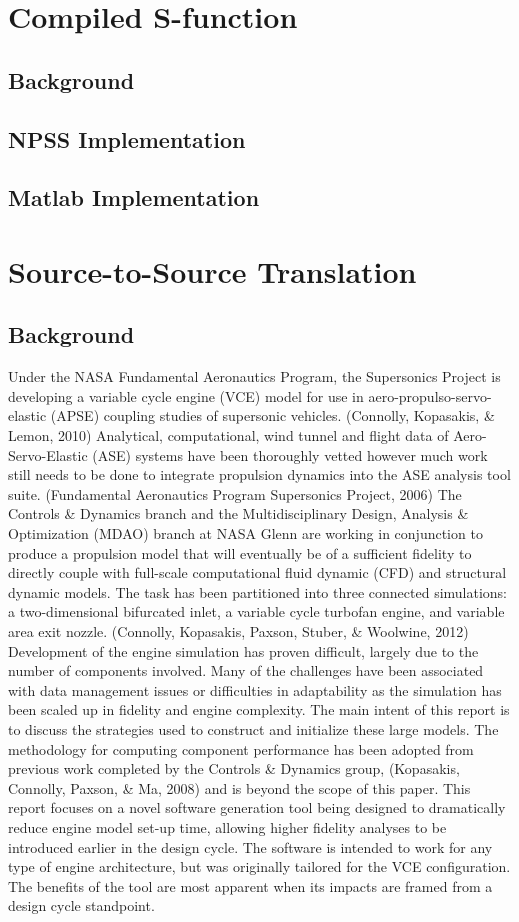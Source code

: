 \documentclass[heading.tex]{subfiles}
\begin{document}
\section{Compiled S-function}
\subsection{Background}
\subsection{NPSS Implementation}
\subsection{Matlab Implementation}

\section{Source-to-Source Translation}
\subsection{Background}
Under the NASA Fundamental Aeronautics Program, the Supersonics Project is developing a variable cycle engine (VCE) model for use in aero-propulso-servo-elastic (APSE) coupling studies of supersonic vehicles. (Connolly, Kopasakis, \& Lemon, 2010) Analytical, computational, wind tunnel and flight data of Aero-Servo-Elastic (ASE) systems have been thoroughly vetted however much work still needs to be done to integrate propulsion dynamics into the ASE analysis tool suite. (Fundamental Aeronautics Program Supersonics Project, 2006)
The Controls \& Dynamics branch and the Multidisciplinary Design, Analysis \& Optimization (MDAO) branch at NASA Glenn are working in conjunction to produce a propulsion model that will eventually be of a sufficient fidelity to directly couple with full-scale computational fluid dynamic (CFD) and structural dynamic models. The task has been partitioned into three connected simulations: a two-dimensional bifurcated inlet, a variable cycle turbofan engine, and variable area exit nozzle. (Connolly, Kopasakis, Paxson, Stuber, \& Woolwine, 2012) 
Development of the engine simulation has proven difficult, largely due to the number of components involved. Many of the challenges have been associated with data management issues or difficulties in adaptability as the simulation has been scaled up in fidelity and engine complexity. The main intent of this report is to discuss the strategies used to construct and initialize these large models.  The methodology for computing component performance has been adopted from previous work completed by the Controls \& Dynamics group, (Kopasakis, Connolly, Paxson, \& Ma, 2008) and is beyond the scope of this paper.
This report focuses on a novel software generation tool being designed to dramatically reduce engine model set-up time, allowing higher fidelity analyses to be introduced earlier in the design cycle. The software is intended to work for any type of engine architecture, but was originally tailored for the VCE configuration. The benefits of the tool are most apparent when its impacts are framed from a design cycle standpoint.
\end{document}
